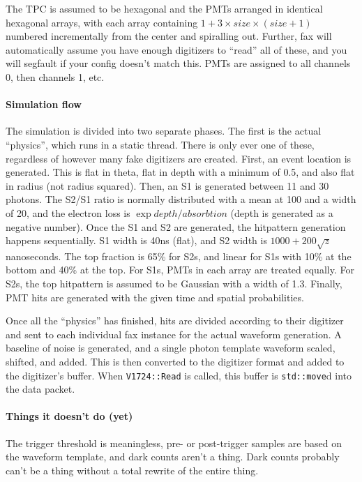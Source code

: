 The TPC is assumed to be hexagonal and the PMTs arranged in identical hexagonal arrays, with each array containing $1+3\times size\times (size+1)$ numbered incrementally from the center and spiralling out.
Further, fax will automatically assume you have enough digitizers to ``read'' all of these, and you will segfault if your config doesn't match this.
PMTs are assigned to all channels 0, then channels 1, etc.

\paragraph{Simulation flow}

The simulation is divided into two separate phases.
The first is the actual ``physics'', which runs in a static thread.
There is only ever one of these, regardless of however many fake digitizers are created.
First, an event location is generated.
This is flat in theta, flat in depth with a minimum of 0.5, and also flat in radius (not radius squared).
Then, an S1 is generated between 11 and 30 photons.
The S2/S1 ratio is normally distributed with a mean at 100 and a width of 20, and the electron loss is $\exp depth/absorbtion$ (depth is generated as a negative number).
Once the S1 and S2 are generated, the hitpattern generation happens sequentially.
S1 width is 40ns (flat), and S2 width is $1000 + 200\sqrt{z}$ nanoseconds.
The top fraction is 65\% for S2s, and linear for S1s with 10\% at the bottom and 40\% at the top.
For S1s, PMTs in each array are treated equally.
For S2s, the top hitpattern is assumed to be Gaussian with a width of 1.3.
Finally, PMT hits are generated with the given time and spatial probabilities.

Once all the ``physics'' has finished, hits are divided according to their digitizer and sent to each individual fax instance for the actual waveform generation.
A baseline of noise is generated, and a single photon template waveform scaled, shifted, and added.
This is then converted to the digitizer format and added to the digitizer's buffer.
When \texttt{V1724::Read} is called, this buffer is \texttt{std::move}d into the data packet.

\paragraph{Things it doesn't do (yet)}

The trigger threshold is meaningless, pre- or post-trigger samples are based on the waveform template, and dark counts aren't a thing.
Dark counts probably can't be a thing without a total rewrite of the entire thing.

